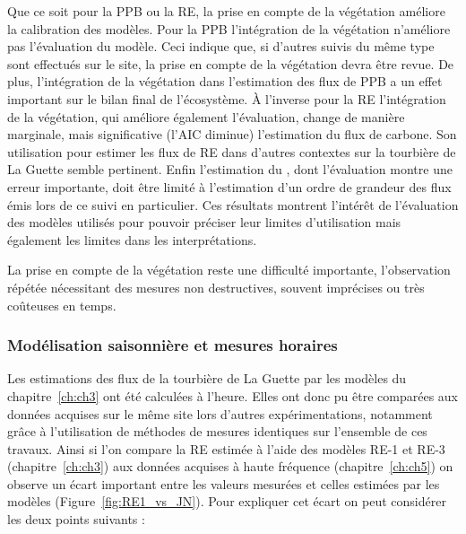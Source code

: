 Que ce soit pour la PPB ou la RE, la prise en compte de la végétation améliore la calibration des modèles.
Pour la PPB l'intégration de la végétation n'améliore pas l'évaluation du modèle.
Ceci indique que, si d'autres suivis du même type sont effectués sur le site, la prise en compte de la végétation devra être revue.
De plus, l'intégration de la végétation dans l'estimation des flux de PPB a un effet important sur le bilan final de l'écosystème.
À l'inverse pour la RE l'intégration de la végétation, qui améliore également l'évaluation, change de manière marginale, mais significative (l'AIC diminue) l'estimation du flux de carbone.
Son utilisation pour estimer les flux de RE dans d'autres contextes sur la tourbière de La Guette semble pertinent.
Enfin l'estimation du \chh, dont l'évaluation montre une erreur importante, doit être limité à l'estimation d'un ordre de grandeur des flux émis lors de ce suivi en particulier.
Ces résultats montrent l'intérêt de l'évaluation des modèles utilisés pour pouvoir préciser leur limites d'utilisation mais également les limites dans les interprétations.

La prise en compte de la végétation reste une difficulté importante, l'observation répétée nécessitant des mesures non destructives, souvent imprécises ou très coûteuses en temps.


\subsubsection*{Modélisation saisonnière et mesures horaires}

Les estimations des flux de la tourbière de La Guette par les modèles du chapitre~\ref{ch:ch3} ont été calculées à l'heure.
Elles ont donc pu être comparées aux données acquises sur le même site lors d'autres expérimentations, notamment grâce à l'utilisation de méthodes de mesures identiques sur l'ensemble de ces travaux.
Ainsi si l'on compare la RE estimée à l'aide des modèles RE-1 et RE-3 (chapitre~\ref{ch:ch3}) aux données acquises à haute fréquence (chapitre~\ref{ch:ch5}) on observe un écart important entre les valeurs mesurées et celles estimées par les modèles (Figure~\ref{fig:RE1_vs_JN}).
Pour expliquer cet écart on peut considérer les deux points suivants : 

